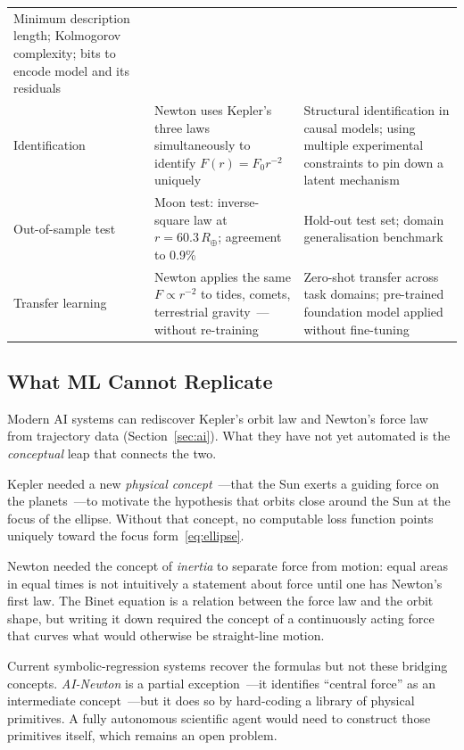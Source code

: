 \documentclass[12pt]{article}
\begin{document}
\begin{table}[htbp]
\begin{tabular}{@{}p{3.8cm}p{5.0cm}p{5.0cm}@{}}
  Minimum description length; Kolmogorov complexity;
  bits to encode model and its residuals \\
Identification &
  Newton uses Kepler's three laws simultaneously to identify
  $F(r)=F_0 r^{-2}$ uniquely &
  Structural identification in causal models;
  using multiple experimental constraints to pin down
  a latent mechanism \\
Out-of-sample test &
  Moon test: inverse-square law at $r = 60.3\,R_\oplus$;
  agreement to 0.9\% &
  Hold-out test set; domain generalisation benchmark \\
Transfer learning &
  Newton applies the same $F\propto r^{-2}$ to tides, comets,
  terrestrial gravity~---without re-training &
  Zero-shot transfer across task domains; pre-trained foundation
  model applied without fine-tuning \\
\bottomrule
\end{tabular}
\end{table}

\subsection{What ML Cannot Replicate}

Modern AI systems can rediscover Kepler's orbit law and Newton's force law
from trajectory data (Section~\ref{sec:ai}).
What they have not yet automated is the \emph{conceptual} leap that connects
the two.

Kepler needed a new \emph{physical concept}~---that the Sun exerts a
guiding force on the planets~---to motivate the hypothesis that orbits close
around the Sun at the focus of the ellipse.
Without that concept, no computable loss function points uniquely toward
the focus form~\eqref{eq:ellipse}.

Newton needed the concept of \emph{inertia} to separate force from motion:
equal areas in equal times is not intuitively a statement about force until
one has Newton's first law.
The Binet equation is a relation between the force law and the orbit shape,
but writing it down required the concept of a continuously acting force
that curves what would otherwise be straight-line motion.

Current symbolic-regression systems recover the formulas but not these
bridging concepts.
\textit{AI-Newton} \citep{FangEtAl2023} is a partial exception~---it
identifies ``central force'' as an intermediate concept~---but it does so
by hard-coding a library of physical primitives.
A fully autonomous scientific agent would need to construct those primitives
itself, which remains an open problem.
\end{document}
